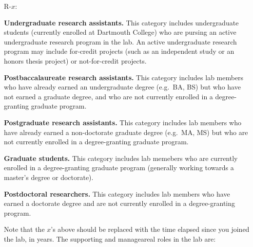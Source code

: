 \documentclass{tufte-book} %
\newcommand{\ourschool}{Dartmouth College}
\begin{document}
\begin{list}{R-$x$:~}{}
\item \textbf{Undergraduate research
    assistants.}  This category
  includes undergraduate students (currently enrolled at \ourschool)
  who are pursing an active undergraduate research program in the lab.
  An active undergraduate research program may include for-credit
  projects (such as an independent study or an honors thesis project)
  or not-for-credit projects.
\item \textbf{Postbaccalaureate research assistants.}  This category
  includes lab members who have already earned an undergraduate degree
  (e.g.\ BA, BS) but who have not earned a graduate degree, and who
  are not currently enrolled in a degree-granting graduate program.
\item \textbf{Postgraduate research assistants.}  This category
  includes lab members who have already earned a non-doctorate
  graduate degree (e.g.\ MA, MS) but who are not currently enrolled in
  a degree-granting graduate program.
\item \textbf{Graduate students.}  This category includes lab memebers
  who are currently enrolled in a degree-granting graduate program
  (generally working towards a master's degree or doctorate).
\item \textbf{Postdoctoral researchers.}  This category includes lab
  members who have earned a doctorate degree and are not currently
  enrolled in a degree-granting program.
\end{list}
Note that the $x$'s above should be replaced with the time elapsed since
you joined the lab, in years.  The supporting and manageareal roles
in the lab are:
\end{document}
